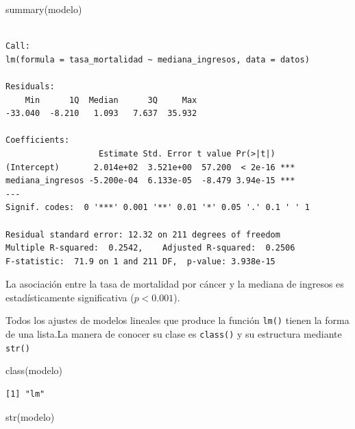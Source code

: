 \documentclass[
  spanish,
  a4paper,
]{scrbook}
\newenvironment{Shaded}{\begin{snugshade}}{\end{snugshade}}
\newcommand{\FunctionTok}[1]{\textcolor[rgb]{0.28,0.35,0.67}{#1}}
\newcommand{\NormalTok}[1]{\textcolor[rgb]{0.00,0.23,0.31}{#1}}
\begin{document}
\begin{Shaded}
\begin{Highlighting}[]
\FunctionTok{summary}\NormalTok{(modelo)}
\end{Highlighting}
\end{Shaded}

\begin{verbatim}

Call:
lm(formula = tasa_mortalidad ~ mediana_ingresos, data = datos)

Residuals:
    Min      1Q  Median      3Q     Max 
-33.040  -8.210   1.093   7.637  35.932 

Coefficients:
                   Estimate Std. Error t value Pr(>|t|)    
(Intercept)       2.014e+02  3.521e+00  57.200  < 2e-16 ***
mediana_ingresos -5.200e-04  6.133e-05  -8.479 3.94e-15 ***
---
Signif. codes:  0 '***' 0.001 '**' 0.01 '*' 0.05 '.' 0.1 ' ' 1

Residual standard error: 12.32 on 211 degrees of freedom
Multiple R-squared:  0.2542,    Adjusted R-squared:  0.2506 
F-statistic:  71.9 on 1 and 211 DF,  p-value: 3.938e-15
\end{verbatim}

La asociación entre la tasa de mortalidad por cáncer y la mediana de
ingresos es estadísticamente significativa (\(p < 0.001\)).

Todos los ajustes de modelos lineales que produce la función
\texttt{lm()} tienen la forma de una lista.La manera de conocer su clase
es \texttt{class()} y su estructura mediante \texttt{str()}

\begin{Shaded}
\begin{Highlighting}[]
\FunctionTok{class}\NormalTok{(modelo)}
\end{Highlighting}
\end{Shaded}

\begin{verbatim}
[1] "lm"
\end{verbatim}

\begin{Shaded}
\begin{Highlighting}[]
\FunctionTok{str}\NormalTok{(modelo)}
\end{Highlighting}
\end{Shaded}
\end{document}
